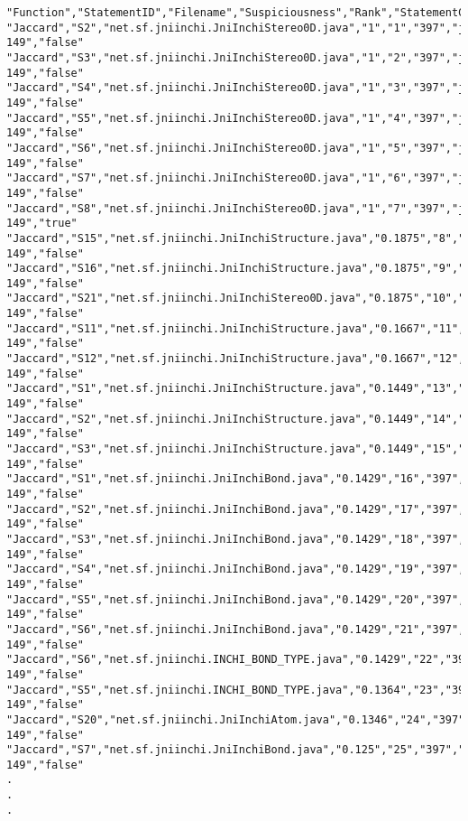 \begin{lstlisting}
"Function","StatementID","Filename","Suspiciousness","Rank","StatementCount","CaseApplication","IsFault"
"Jaccard","S2","net.sf.jniinchi.JniInchiStereo0D.java","1","1","397","jniinchi-149","false"
"Jaccard","S3","net.sf.jniinchi.JniInchiStereo0D.java","1","2","397","jniinchi-149","false"
"Jaccard","S4","net.sf.jniinchi.JniInchiStereo0D.java","1","3","397","jniinchi-149","false"
"Jaccard","S5","net.sf.jniinchi.JniInchiStereo0D.java","1","4","397","jniinchi-149","false"
"Jaccard","S6","net.sf.jniinchi.JniInchiStereo0D.java","1","5","397","jniinchi-149","false"
"Jaccard","S7","net.sf.jniinchi.JniInchiStereo0D.java","1","6","397","jniinchi-149","false"
"Jaccard","S8","net.sf.jniinchi.JniInchiStereo0D.java","1","7","397","jniinchi-149","true"
"Jaccard","S15","net.sf.jniinchi.JniInchiStructure.java","0.1875","8","397","jniinchi-149","false"
"Jaccard","S16","net.sf.jniinchi.JniInchiStructure.java","0.1875","9","397","jniinchi-149","false"
"Jaccard","S21","net.sf.jniinchi.JniInchiStereo0D.java","0.1875","10","397","jniinchi-149","false"
"Jaccard","S11","net.sf.jniinchi.JniInchiStructure.java","0.1667","11","397","jniinchi-149","false"
"Jaccard","S12","net.sf.jniinchi.JniInchiStructure.java","0.1667","12","397","jniinchi-149","false"
"Jaccard","S1","net.sf.jniinchi.JniInchiStructure.java","0.1449","13","397","jniinchi-149","false"
"Jaccard","S2","net.sf.jniinchi.JniInchiStructure.java","0.1449","14","397","jniinchi-149","false"
"Jaccard","S3","net.sf.jniinchi.JniInchiStructure.java","0.1449","15","397","jniinchi-149","false"
"Jaccard","S1","net.sf.jniinchi.JniInchiBond.java","0.1429","16","397","jniinchi-149","false"
"Jaccard","S2","net.sf.jniinchi.JniInchiBond.java","0.1429","17","397","jniinchi-149","false"
"Jaccard","S3","net.sf.jniinchi.JniInchiBond.java","0.1429","18","397","jniinchi-149","false"
"Jaccard","S4","net.sf.jniinchi.JniInchiBond.java","0.1429","19","397","jniinchi-149","false"
"Jaccard","S5","net.sf.jniinchi.JniInchiBond.java","0.1429","20","397","jniinchi-149","false"
"Jaccard","S6","net.sf.jniinchi.JniInchiBond.java","0.1429","21","397","jniinchi-149","false"
"Jaccard","S6","net.sf.jniinchi.INCHI_BOND_TYPE.java","0.1429","22","397","jniinchi-149","false"
"Jaccard","S5","net.sf.jniinchi.INCHI_BOND_TYPE.java","0.1364","23","397","jniinchi-149","false"
"Jaccard","S20","net.sf.jniinchi.JniInchiAtom.java","0.1346","24","397","jniinchi-149","false"
"Jaccard","S7","net.sf.jniinchi.JniInchiBond.java","0.125","25","397","jniinchi-149","false"
.
.
.


\end{lstlisting}
